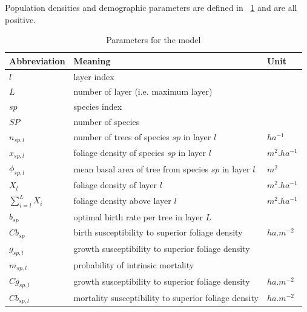 \documentclass{article}
\begin{document}
Population densities and demographic parameters are defined in ~\ref{tab:coef} and are all positive.

\begin{table}[H]
    \centering
    \begin{tabular}{l l l}
    \hline
    \hline
    \textbf{Abbreviation} & \textbf{Meaning} & \textbf{Unit} \\
    \hline
    \hline
    $l$            & layer index                                                 &          \\
    $L$            & number of layer (i.e. maximum layer)                        &          \\
    $sp$           & species index                                               &          \\
    $SP$           & number of species                                           &            \\
    $n_{sp,l}$     & number of trees of species $sp$ in layer $l$                & $ha^{-1}$  \\    
    $x_{sp,l}$     & foliage density of species $sp$ in layer $l$                & $m^2.ha^{-1}$  \\
    $\phi_{sp,l}$     & mean basal area of tree from species $sp$ in layer $l$    & $m^2$  \\
    $X_{l}$        & foliage density of layer $l$                                & $m^2.ha^{-1}$  \\ 
    $\sum_{i = l}^{L} X_{i}$     & foliage density above layer $l$      & $m^2.ha^{-1}$  \\ 
    $b_{sp}$       & optimal birth rate per tree in layer $L$    &  \\
    $Cb_{sp}$      & birth susceptibility to superior foliage density    & $ha.m^{-2}$           \\
    $g_{sp,l}$     & growth susceptibility to superior foliage density           &  \\
    $m_{sp,l}$     & probability of intrinsic mortality           & \\
    $Cg_{sp,l}$    & growth susceptibility to superior foliage density            &   $ha.m^{-2}$  \\
    $Cb_{sp,l}$    & mortality susceptibility to superior foliage density            & $ha.m^{-2}$    \\
    \hline
    \hline
    \end{tabular}
    \caption{Parameters for the model}
    \label{tab:coef}
\end{table}
\end{document}
